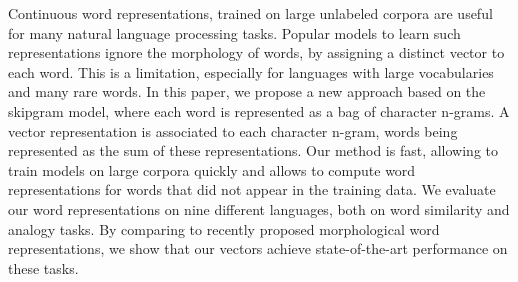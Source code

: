 Continuous word representations, trained on large unlabeled corpora are useful for many natural language processing tasks. Popular models to learn such representations  ignore the morphology of words, by assigning a distinct vector to each word. This is a limitation, especially for languages with large vocabularies and many rare words. In this paper, we propose a new approach based on the skipgram model, where each word is represented as a bag of character n-grams. A vector representation is associated to each character n-gram, words being represented as the sum of these representations. Our method is fast, allowing to train models on large corpora quickly and allows to compute word representations for words that did not appear in the training data. We evaluate our word representations on nine different languages, both on word similarity and analogy tasks. By comparing to recently proposed morphological word representations, we show that our vectors achieve state-of-the-art performance on these tasks.